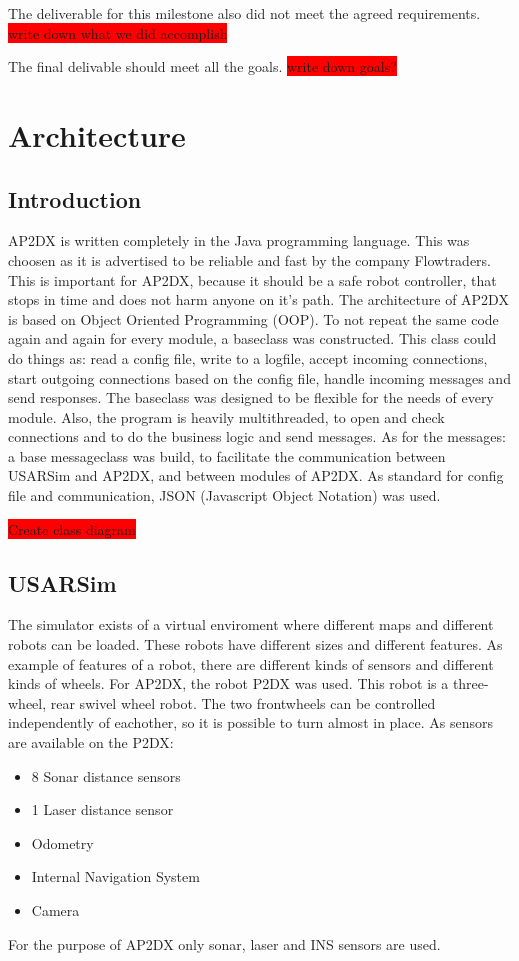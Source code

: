 \documentclass[titlepage, a4paper,10pt]{article}
\newcommand{\todo}[1]{\colorbox{red}{\color{white}#1}}
\begin{document}
The deliverable for this milestone also did not meet the agreed requirements. 
\todo{write down what we did accomplish}

The final delivable should meet all the goals. 
\todo{write down goals?}

\newpage

\section{Architecture}
\subsection{Introduction}
AP2DX is written completely in the Java programming language. 
This was choosen as it is advertised to be reliable and fast by the company Flowtraders. This is important for AP2DX, because it should be a safe robot controller, that stops in time and does not harm anyone on it's path. The architecture of AP2DX is based on Object Oriented Programming (OOP). 
To not repeat the same code again and again for every module, a baseclass was constructed. 
This class could do things as: read a config file, write to a logfile, accept incoming connections, start outgoing connections based on the config file, handle incoming messages and send responses. 
The baseclass was designed to be flexible for the needs of every module. Also, the program is heavily multithreaded, to open and check connections and to do the business logic and send messages. As for the messages: a base messageclass was build, to facilitate the communication between USARSim and AP2DX, and between modules of AP2DX. As standard for config file and communication, JSON (Javascript Object Notation) was used. 

\todo{Create class diagram}

\subsection{USARSim}
The simulator exists of a virtual enviroment where different maps and different robots can be loaded. These robots have different sizes and different features. As example of features of a robot, there are different kinds of sensors and different kinds of wheels. For AP2DX, the robot P2DX was used. This robot is a three-wheel, rear swivel wheel robot. The two frontwheels can be controlled independently of eachother, so it is possible to turn almost in place. As sensors are available on the P2DX:
\begin{itemize}
\item 8 Sonar distance sensors
\item 1 Laser distance sensor
\item Odometry
\item Internal Navigation System
\item Camera
\end{itemize}
For the purpose of AP2DX only sonar, laser and INS sensors are used.
\end{document}
